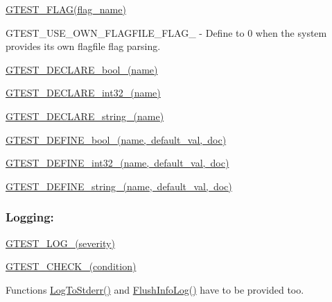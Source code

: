 \begin{DoxyItemize}
\item {\ttfamily \mbox{\hyperlink{gtest-port_8h_a828f4e34a1c4b510da50ec1563e3562a}{G\+T\+E\+S\+T\+\_\+\+F\+L\+A\+G(flag\+\_\+name)}}}
\item {\ttfamily G\+T\+E\+S\+T\+\_\+\+U\+S\+E\+\_\+\+O\+W\+N\+\_\+\+F\+L\+A\+G\+F\+I\+L\+E\+\_\+\+F\+L\+A\+G\+\_\+} -\/ Define to 0 when the system provides its own flagfile flag parsing.
\item {\ttfamily \mbox{\hyperlink{gtest-port_8h_a14eb0e9c6e0df765d1fbfd2db6966d14}{G\+T\+E\+S\+T\+\_\+\+D\+E\+C\+L\+A\+R\+E\+\_\+bool\+\_\+(name)}}}
\item {\ttfamily \mbox{\hyperlink{gtest-port_8h_aab2ee98cb616054b1d3a7dc71efe81fc}{G\+T\+E\+S\+T\+\_\+\+D\+E\+C\+L\+A\+R\+E\+\_\+int32\+\_\+(name)}}}
\item {\ttfamily \mbox{\hyperlink{gtest-port_8h_a9f74eee05f7ee5534139a622fe7da7dd}{G\+T\+E\+S\+T\+\_\+\+D\+E\+C\+L\+A\+R\+E\+\_\+string\+\_\+(name)}}}
\item {\ttfamily \mbox{\hyperlink{gtest-port_8h_a48e05814779e5a2f432b06a12618a760}{G\+T\+E\+S\+T\+\_\+\+D\+E\+F\+I\+N\+E\+\_\+bool\+\_\+(name, default\+\_\+val, doc)}}}
\item {\ttfamily \mbox{\hyperlink{gtest-port_8h_a88ee2f19589ffff86ca742fd33611358}{G\+T\+E\+S\+T\+\_\+\+D\+E\+F\+I\+N\+E\+\_\+int32\+\_\+(name, default\+\_\+val, doc)}}}
\item {\ttfamily \mbox{\hyperlink{gtest-port_8h_a885e18fe217a6e85553d408b99252c12}{G\+T\+E\+S\+T\+\_\+\+D\+E\+F\+I\+N\+E\+\_\+string\+\_\+(name, default\+\_\+val, doc)}}}
\end{DoxyItemize}

\subsubsection*{Logging\+:}


\begin{DoxyItemize}
\item {\ttfamily \mbox{\hyperlink{gtest-port_8h_a8ef4cb4c465db8c15464aecc6d9510ef}{G\+T\+E\+S\+T\+\_\+\+L\+O\+G\+\_\+(severity)}}}
\item {\ttfamily \mbox{\hyperlink{gtest-port_8h_ab54343f0a36dc4cb0ce8a478dd7847b8}{G\+T\+E\+S\+T\+\_\+\+C\+H\+E\+C\+K\+\_\+(condition)}}}
\item Functions {\ttfamily \mbox{\hyperlink{namespacetesting_1_1internal_a06b1b20029fbd1dbeb59752f914fab84}{Log\+To\+Stderr()}}} and {\ttfamily \mbox{\hyperlink{namespacetesting_1_1internal_a2135f223bf6b527729aeaa651115183b}{Flush\+Info\+Log()}}} have to be provided too.
\end{DoxyItemize}

